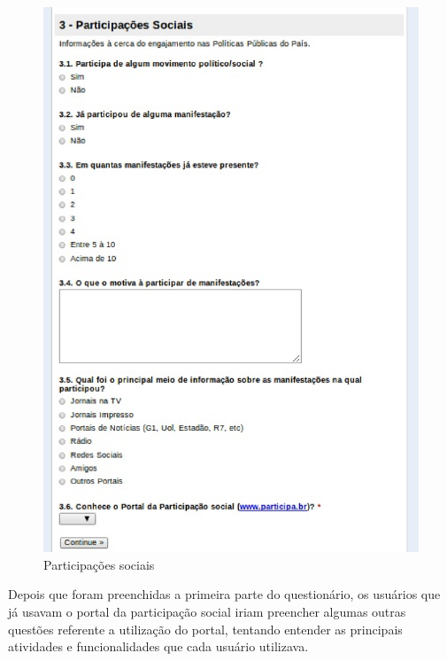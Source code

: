 \begin{figure}[!h]
    \centering
    \includegraphics[keepaspectratio=true,scale=0.60]
      {figuras/perf4.eps}
    \caption{Participações sociais}
    \label{participações}
\end{figure}

\newpage

	Depois que foram preenchidas a primeira parte do questionário, os usuários que já usavam o portal da participação social iriam preencher algumas outras questões referente a utilização do portal, tentando entender as principais atividades e funcionalidades que cada usuário utilizava.




